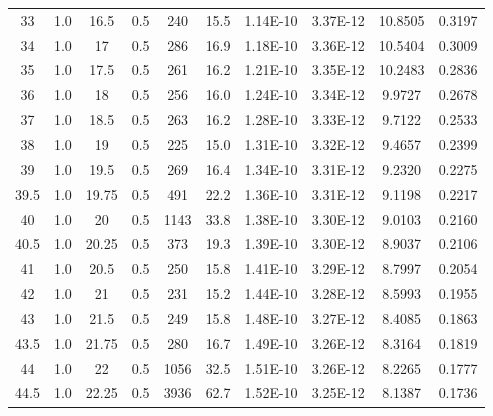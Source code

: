 \begin{maintable}[ht]
\begin{tabular}{cccccccccc}
33          & 1.0   & 16.5       & 0.5           & 240     & 15.5       & 1.14E-10    & 3.37E-12       & 10.8505   & 0.3197       \\
34          & 1.0   & 17         & 0.5           & 286     & 16.9       & 1.18E-10    & 3.36E-12       & 10.5404   & 0.3009       \\
35          & 1.0   & 17.5       & 0.5           & 261     & 16.2       & 1.21E-10    & 3.35E-12       & 10.2483   & 0.2836       \\
36          & 1.0   & 18         & 0.5           & 256     & 16.0       & 1.24E-10    & 3.34E-12       & 9.9727    & 0.2678       \\
37          & 1.0   & 18.5       & 0.5           & 263     & 16.2       & 1.28E-10    & 3.33E-12       & 9.7122    & 0.2533       \\
38          & 1.0   & 19         & 0.5           & 225     & 15.0       & 1.31E-10    & 3.32E-12       & 9.4657    & 0.2399       \\
39          & 1.0   & 19.5       & 0.5           & 269     & 16.4       & 1.34E-10    & 3.31E-12       & 9.2320    & 0.2275       \\
39.5        & 1.0   & 19.75      & 0.5           & 491     & 22.2       & 1.36E-10    & 3.31E-12       & 9.1198    & 0.2217       \\
40          & 1.0   & 20         & 0.5           & 1143    & 33.8       & 1.38E-10    & 3.30E-12       & 9.0103    & 0.2160       \\
40.5        & 1.0   & 20.25      & 0.5           & 373     & 19.3       & 1.39E-10    & 3.30E-12       & 8.9037    & 0.2106       \\
41          & 1.0   & 20.5       & 0.5           & 250     & 15.8       & 1.41E-10    & 3.29E-12       & 8.7997    & 0.2054       \\
42          & 1.0   & 21         & 0.5           & 231     & 15.2       & 1.44E-10    & 3.28E-12       & 8.5993    & 0.1955       \\
43          & 1.0   & 21.5       & 0.5           & 249     & 15.8       & 1.48E-10    & 3.27E-12       & 8.4085    & 0.1863       \\
43.5        & 1.0   & 21.75      & 0.5           & 280     & 16.7       & 1.49E-10    & 3.26E-12       & 8.3164    & 0.1819       \\
44          & 1.0   & 22         & 0.5           & 1056    & 32.5       & 1.51E-10    & 3.26E-12       & 8.2265    & 0.1777       \\
44.5        & 1.0   & 22.25      & 0.5           & 3936    & 62.7       & 1.52E-10    & 3.25E-12       & 8.1387    & 0.1736       \\

\end{tabular}
\end{maintable}
